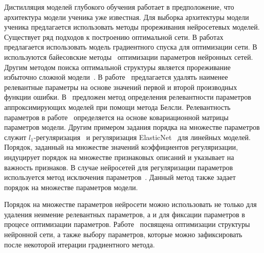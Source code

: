 Дистилляция моделей глубокого обучения работает в предположение, что архитектура модели ученика уже известная. Для выборка архитектуры модели ученика предлагается использовать методы прореживания нейросетевых моделей. Существует ряд подходов к построению оптимальной сети. В работах~\cite{maclarin2015, luketina2015} предлагается использовать модель градиентного спуска для оптимизации сети. В~\cite{molchanov2017} используются байесовские методы~\cite{neal1995} оптимизации параметров нейронных сетей. Другим методом поиска оптимальной структуры является прореживание избыточно сложной модели~\cite{cun1990, louizos2017, graves2011}. В работе~\cite{cun1990} предлагается удалять наименее релевантные параметры на основе значений первой и второй производных функции ошибки. В~\cite{grabovoy2019} предложен метод определения релевантности параметров аппроксимирующих моделей при помощи метода Белсли. Релевантность параметров в работе~\cite{grabovoy2019} определяется на основе ковариационной матрицы параметров модели.
Другим примером задания порядка на множестве параметров служит $l_1$-регуляризация~\cite{Tibshirani1996} и регуляризация ElasticNet~\cite{Hastie2005} для линейных моделей.
Порядок, заданный на множестве значений коэффициентов регуляризации, индуцирует порядок на множестве признаковых описаний и указывает на важность признаков.
В случае нейросетей для регуляризации параметров используется метод исключения параметров~\cite{srivastava2014, molchanov2017}.
Данный метод также задает порядок на множестве параметров модели.

Порядок на множестве параметров нейросети можно использовать не только для удаления неимение релевантных параметров, а и для фиксации параметров в процесе оптимизации параметров. Работе~\cite{grabovoy2020} посвящена оптимизации структуры нейронной сети, а также выбору параметров, которые можно зафиксировать после некоторой итерации градиентного метода.
